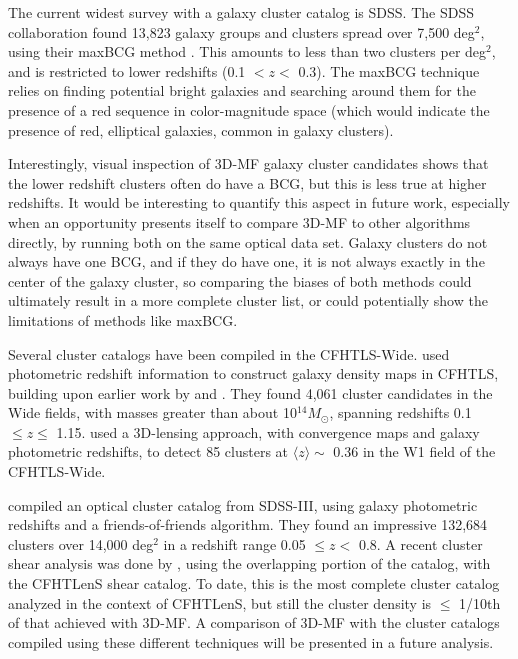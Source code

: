 The current widest survey with a galaxy cluster catalog is \ac{SDSS}. The \ac{SDSS} collaboration found 13,823 galaxy groups and clusters spread over 7,500 deg$^2$, using their maxBCG method \citep{Koester07}. This amounts to less than two clusters per deg$^2$, and is restricted to lower redshifts (0.1 $< z <$ 0.3). The maxBCG technique relies on finding potential bright galaxies and searching around them for the presence of a red sequence in color-magnitude space (which would indicate the presence of red, elliptical galaxies, common in galaxy clusters). 

Interestingly, visual inspection of \ac{3D-MF} galaxy cluster candidates shows that the lower redshift clusters often do have a \ac{BCG}, but this is less true at higher redshifts. It would be interesting to quantify this aspect in future work, especially when an opportunity presents itself to compare \ac{3D-MF} to other algorithms directly, by running both on the same optical data set. Galaxy clusters do not always have one \ac{BCG}, and if they do have one, it is not always exactly in the center of the galaxy cluster, so comparing the biases of both methods could ultimately result in a more complete cluster list, or could potentially show the limitations of methods like maxBCG. 

Several cluster catalogs have been compiled in the \ac{CFHTLS}-Wide. \citet{Durret11} used photometric redshift information to construct galaxy density maps in \ac{CFHTLS}, building upon earlier work by \citet{Adami10} and \citet{Mazure07}. They found 4,061 cluster candidates in the Wide fields, with masses greater than about 10$^{14} M_{\odot}$, spanning redshifts 0.1 $\le z \le$ 1.15. \citet{Shan12} used a 3D-lensing approach, with convergence maps and galaxy photometric redshifts, to detect 85 clusters at $\langle z \rangle \sim$ 0.36 in the W1 field of the \ac{CFHTLS}-Wide.

\citet{Wen12} compiled an optical cluster catalog from \ac{SDSS}-III, using galaxy photometric redshifts and a friends-of-friends algorithm. They found an impressive 132,684 clusters over 14,000 deg$^2$ in a redshift range 0.05 $\leq z <$ 0.8. A recent cluster shear analysis was done by \citet{Covone14}, using the overlapping portion of the \citet{Wen12} catalog, with the \ac{CFHTLenS} shear catalog. To date, this is the most complete cluster catalog analyzed in the context of \ac{CFHTLenS}, but still the cluster density is $\leq$ 1/10th of that achieved with \ac{3D-MF}. A comparison of \ac{3D-MF} with the cluster catalogs compiled using these different techniques will be presented in a future analysis.

